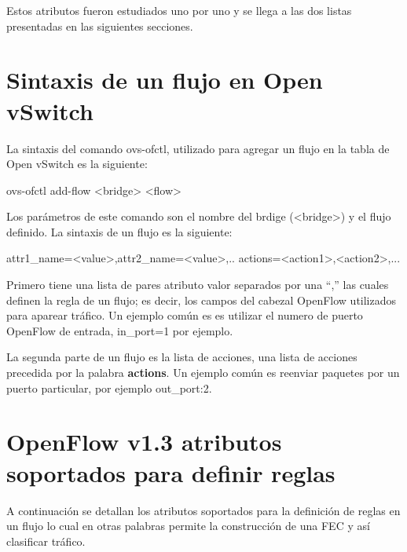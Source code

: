 Estos atributos fueron estudiados uno por uno y se llega a las dos listas presentadas en las siguientes secciones.\\

\section{Sintaxis de un flujo en Open vSwitch}
La sintaxis del comando ovs-ofctl, utilizado para agregar un flujo en la tabla de Open vSwitch es la siguiente:

\begin{center}
ovs-ofctl add-flow <bridge> <flow>
\end{center}

Los parámetros de este comando son el nombre del brdige (<bridge>) y el flujo definido. La sintaxis de un flujo es la siguiente:

\begin{center}
attr1\_name=<value>,attr2\_name=<value>,.. actions=<action1>,<action2>,...
\end{center}

Primero tiene una lista de pares atributo valor separados por una “,” las cuales definen la regla de un flujo; es decir, los campos del cabezal OpenFlow utilizados para aparear tr\'afico. Un ejemplo común es es utilizar el numero de puerto OpenFlow de entrada, in\_port=1 por ejemplo.

La segunda parte de un flujo es la lista de acciones, una lista de acciones precedida por la palabra \textbf{actions}. Un ejemplo común es reenviar paquetes por un puerto particular, por ejemplo out\_port:2. 
 
\section{OpenFlow v1.3 atributos soportados para definir reglas}

A continuaci\'on se detallan los atributos soportados para la definici\'on de reglas en un flujo lo cual en otras palabras permite la construcci\'on de una FEC y así clasificar tr\'afico.

